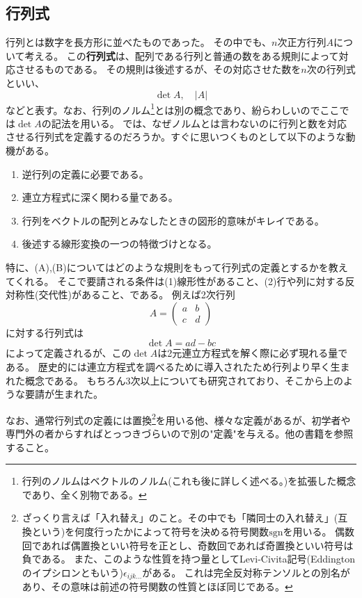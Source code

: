 \documentclass[10pt]{jsreport}
\theoremstyle{definition}%
\numberwithin{equation}{section}%
\begin{document}
\subsection{行列式}
行列とは数字を長方形に並べたものであった。
その中でも、$n$次正方行列$A$について考える。
この{\bf 行列式}は、配列である行列と普通の数をある規則によって対応させるものである。
その規則は後述するが、その対応させた数を$n$次の行列式といい、
\begin{equation}
  \det A , \quad |A|
\end{equation}
などと表す。なお、行列のノルム\footnote{行列のノルムはベクトルのノルム(これも後に詳しく述べる。)を拡張した概念であり、全く別物である。}とは別の概念であり、紛らわしいのでここでは$\det A$の記法を用いる。
では、なぜノルムとは言わないのに行列と数を対応させる行列式を定義するのだろうか。すぐに思いつくものとして以下のような動機がある。
\begin{enumerate}
  \item 逆行列の定義に必要である。
  \item 連立方程式に深く関わる量である。
  \item 行列をベクトルの配列とみなしたときの図形的意味がキレイである。
  \item 後述する線形変換の一つの特徴づけとなる。
\end{enumerate}
特に、(A),(B)についてはどのような規則をもって行列式の定義とするかを教えてくれる。
そこで要請される条件は(1)線形性があること、(2)行や列に対する反対称性(交代性)があること、である。
例えば2次行列 
\begin{equation}
A=\begin{pmatrix}
  a & b \\
  c & d
\end{pmatrix}  
\end{equation}
に対する行列式は
\begin{equation}
  \det A =ad- bc
\end{equation}
によって定義されるが、この$\det A$は2元連立方程式を解く際に必ず現れる量である。
歴史的には連立方程式を調べるために導入されたため行列より早く生まれた概念である。
もちろん3次以上についても研究されており、そこから上のような要請が生まれた。

なお、通常行列式の定義には置換\footnote{ざっくり言えば「入れ替え」のこと。その中でも「隣同士の入れ替え」(互換という)を何度行ったかによって符号を決める符号関数$\mathrm{sgn}$を用いる。
偶数回であれば偶置換といい符号を正とし、奇数回であれば奇置換といい符号は負である。
また、このような性質を持つ量としてLevi-Civita記号(Eddingtonのイプシロンともいう)$\epsilon_{ijk\ldots}$がある。
これは完全反対称テンソルとの別名があり、その意味は前述の符号関数の性質とほぼ同じである。}を用いる他、様々な定義があるが、初学者や専門外の者からすればとっつきづらいので別の"定義"を与える。他の書籍を参照すること。
\end{document}
